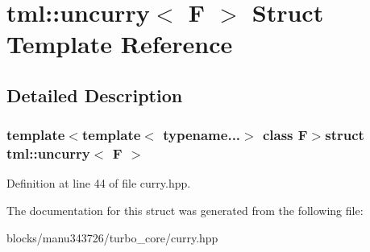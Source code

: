 \hypertarget{structtml_1_1uncurry}{\section{tml\+:\+:uncurry$<$ F $>$ Struct Template Reference}
\label{structtml_1_1uncurry}
}


\subsection{Detailed Description}
\subsubsection*{template$<$template$<$ typename...$>$ class F$>$struct tml\+::uncurry$<$ F $>$}



Definition at line 44 of file curry.\+hpp.



The documentation for this struct was generated from the following file\+:\begin{DoxyCompactItemize}
\item 
blocks/manu343726/turbo\+\_\+core/curry.\+hpp\end{DoxyCompactItemize}
